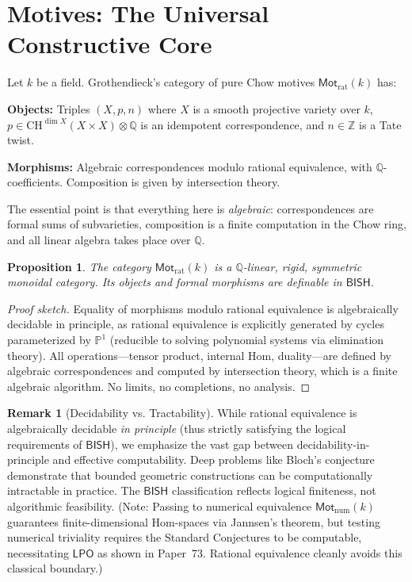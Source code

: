 \documentclass[11pt,a4paper]{article}
\theoremstyle{plain}
\newtheorem{proposition}[theorem]{Proposition}
\theoremstyle{definition}
\newtheorem{remark}[theorem]{Remark}
\newcommand{\BISH}{\textsf{BISH}}
\newcommand{\LPO}{\textsf{LPO}}
\newcommand{\Mot}{\mathsf{Mot}}
\newcommand{\Z}{\mathbb{Z}}
\newcommand{\Q}{\mathbb{Q}}
\begin{document}
\section{Motives: The Universal Constructive Core}\label{sec:motives}

Let $k$ be a field. Grothendieck's category of pure Chow motives $\Mot_{\mathrm{rat}}(k)$ has:

\textbf{Objects:} Triples $(X, p, n)$ where $X$ is a smooth projective variety over $k$, $p \in \mathrm{CH}^{\dim X}(X \times X) \otimes \Q$ is an idempotent correspondence, and $n \in \Z$ is a Tate twist.

\textbf{Morphisms:} Algebraic correspondences modulo rational equivalence, with $\Q$-coefficients. Composition is given by intersection theory.

The essential point is that everything here is \emph{algebraic}: correspondences are formal sums of subvarieties, composition is a finite computation in the Chow ring, and all linear algebra takes place over $\Q$.

\begin{proposition}\label{prop:motive-bish}
The category $\Mot_{\mathrm{rat}}(k)$ is a $\Q$-linear, rigid, symmetric monoidal category. Its objects and formal morphisms are definable in $\BISH$.
\end{proposition}

\begin{proof}[Proof sketch]
Equality of morphisms modulo rational equivalence is algebraically decidable in principle, as rational equivalence is explicitly generated by cycles parameterized by $\mathbb{P}^1$ (reducible to solving polynomial systems via elimination theory). All operations---tensor product, internal Hom, duality---are defined by algebraic correspondences and computed by intersection theory, which is a finite algebraic algorithm. No limits, no completions, no analysis.
\end{proof}

\begin{remark}[Decidability vs. Tractability]\label{rmk:decidability}
While rational equivalence is algebraically decidable \emph{in principle} (thus strictly satisfying the logical requirements of $\BISH$), we emphasize the vast gap between decidability-in-principle and effective computability. Deep problems like Bloch's conjecture demonstrate that bounded geometric constructions can be computationally intractable in practice. The $\BISH$ classification reflects logical finiteness, not algorithmic feasibility. (Note: Passing to numerical equivalence $\Mot_{\mathrm{num}}(k)$ guarantees finite-dimensional Hom-spaces via Jannsen's theorem, but testing numerical triviality requires the Standard Conjectures to be computable, necessitating $\LPO$ as shown in Paper~73. Rational equivalence cleanly avoids this classical boundary.)
\end{remark}
\end{document}
